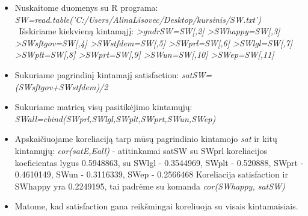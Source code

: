 \documentclass[12pt,a4paper]{article}
\theoremstyle{change}\newtheorem{salyga}{Uždavinys}
\begin{document}
\begin{itemize}
\item Nuskaitome duomenys su R programa: 
\newline
\textit {SW=read.table('C:/Users/AlinaLisovec/Desktop/kursinis/SW.txt')}
\ Išskiriame kiekvieną kintamąjį:
\newline
\textit {>gndrSW=SW[,2] 
\newline >SWhappy=SW[,3] 
\newline >SWsftgov=SW[,4]
\newline >SWstfdem=SW[,5]
\newline >SWprl=SW[,6]
\newline >SWlgl=SW[,7]
\newline >SWplt=SW[,8]
\newline >SWprt=SW[,9]
\newline >SWun=SW[,10]
\newline >SWep=SW[,11]}

\item Sukuriame pagrindinį kintamajį satisfaction:
\newline 
\textit{satSW=(SWsftgov+SWstfdem)/2}
\item Sukuriame matricą visų pasitikėjimo kintamųjų:
\newline \textit {SWall=cbind(SWprl,SWlgl,SWplt,SWprt,SWun,SWep)}
\item Apskaičiuojame koreliaciją tarp mūsų pagrindinio kintamojo \textit{sat} ir kitų kintamųjų:
\newline  \textit{cor(satE,Eall)}  -  atitinkamai satSW su SWprl koreliacijos koeficientas lygus 0.5948863,  su  SWlgl - 0.3544969,  SWplt - 0.520888, SWprt - 0.4610149, SWun - 0.3116339, SWep - 0.2566468
\newline Koreliacija satisfaction ir  SWhappy yra 0.2249195, tai padrėme su komanda 
\newline \textit{cor(SWhappy, satSW)}
\item Matome, kad satisfaction gana reikšmingai koreliuoja su visais kintamaisiais.


\end{itemize}
\end{document}
